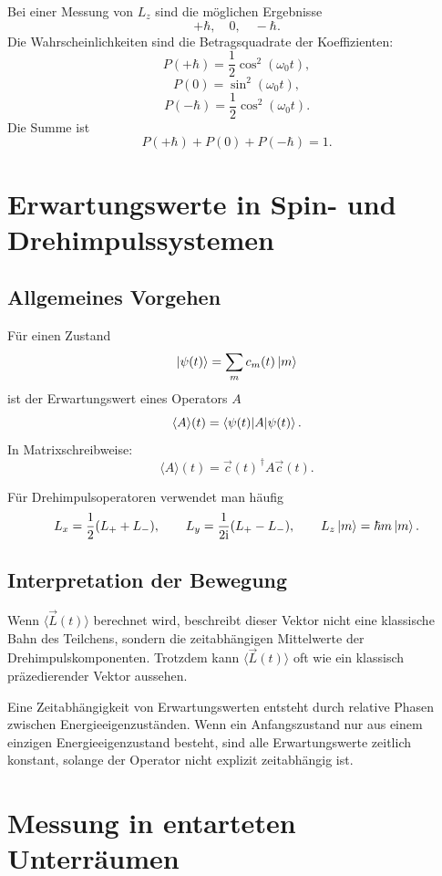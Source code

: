Bei einer Messung von \(L_z\) sind die möglichen Ergebnisse
\[
    +\hbar,
    \quad
    0,
    \quad
    -\hbar.
\]
Die Wahrscheinlichkeiten sind die Betragsquadrate der Koeffizienten:
\[
    P(+\hbar)=\frac12\cos^2(\omega_0t),
\]
\[
    P(0)=\sin^2(\omega_0t),
\]
\[
    P(-\hbar)=\frac12\cos^2(\omega_0t).
\]
Die Summe ist
\[
    P(+\hbar)+P(0)+P(-\hbar)=1.
\]

\section{Erwartungswerte in Spin- und Drehimpulssystemen}

\subsection{Allgemeines Vorgehen}

Für einen Zustand
\[
    \left|\psi(t)\right\rangle=\sum_m c_m(t)\left|m\right\rangle
\]
ist der Erwartungswert eines Operators \(A\)
\[
    \langle A\rangle(t)=\left\langle\psi(t)\middle|A\middle|\psi(t)\right\rangle.
\]
In Matrixschreibweise:
\[
    \langle A\rangle(t)=\vec c(t)^{\,\dagger}A\vec c(t).
\]

Für Drehimpulsoperatoren verwendet man häufig
\[
    L_x=\frac12(L_++L_-),
    \qquad
    L_y=\frac{1}{2\mathrm{i}}(L_+-L_-),
    \qquad
    L_z\left|m\right\rangle=\hbar m\left|m\right\rangle.
\]

\subsection{Interpretation der Bewegung}

Wenn \(\langle \vec L(t)\rangle\) berechnet wird, beschreibt dieser Vektor nicht eine klassische Bahn des Teilchens, sondern die zeitabhängigen Mittelwerte der Drehimpulskomponenten. Trotzdem kann \(\langle \vec L(t)\rangle\) oft wie ein klassisch präzedierender Vektor aussehen.

\begin{conceptbox}
Eine Zeitabhängigkeit von Erwartungswerten entsteht durch relative Phasen zwischen Energieeigenzuständen. Wenn ein Anfangszustand nur aus einem einzigen Energieeigenzustand besteht, sind alle Erwartungswerte zeitlich konstant, solange der Operator nicht explizit zeitabhängig ist.
\end{conceptbox}

\section{Messung in entarteten Unterräumen}

